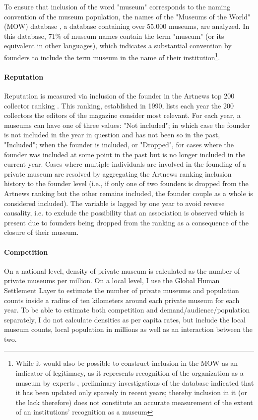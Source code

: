 \documentclass[12pt]{article}
\begin{document}
To ensure that inclusion of the word "museum" corresponds to the naming convention of the museum population, the names of the "Museums of the World" (MOW) database \parencite{deGruyter_2021_MOW}, a database containing over 55.000 museums, are analyzed.
In this database, 71\% of museum names contain the term "museum" (or its equivalent in other languages), which indicates a substantial convention by founders to include the term museum in the name of their institution\footnote{While it would also be possible to construct inclusion in the MOW as an indicator of legitimacy, as it represents recognition of the organization as a museum by experts \parencite{Zuckerman_1999_illegitimacy}, preliminary investigations of the database indicated that it has been  updated only sparsely in recent years; thereby inclusion in it (or the lack therefore) does not constitute an accurate measurement of the extent of an institutions' recognition as a museum}.
\paragraph*{Reputation}


Reputation is measured via inclusion of the founder in the Artnews top 200 collector ranking \parencite{Artnews_ranking}.
This ranking, established in 1990, lists each year the 200 collectors the editors of the magazine consider most relevant.
For each year, a museums can have one of three values: "Not included"; in which case the founder is not included in the year in question and has not been so in the past, "Included"; when the founder is included, or "Dropped", for cases where the founder was included at some point in the past but is no longer included in the current year.
Cases where multiple individuals are involved in the founding of a private museum are resolved by aggregating the Artnews ranking inclusion history to the founder level (i.e., if only one of two founders is dropped from the Artnews ranking but the other remains included, the founder couple as a whole is considered included).
The variable is lagged by one year to avoid reverse causality, i.e. to exclude the possibility that an association is observed which is present due to founders being dropped from the ranking as a consequence of the closure of their museum.
\paragraph*{Competition}

On a national level, density of private museum is calculated as the number of private museums per million.
On a local level, I use the Global Human Settlement Layer \parencite{EC_2023_GHSL} to estimate the number of private museums and population counts inside a radius of ten kilometers around each private museum for each year.
To be able to estimate both competition and demand/audience/population separately, I do not calculate densities as per capita rates, but include the local museum counts, local population in millions as well as an interaction between the two.
\end{document}
